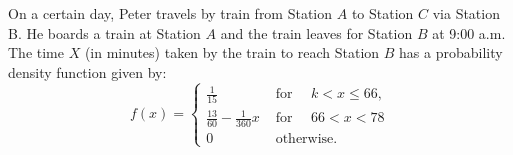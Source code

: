 \documentclass[letterpaper,10pt,addpoints]{exam}
\begin{document}


\newpage
\begin{questions}

\question[40]
On a certain day, Peter travels by train from Station $A$ to Station $C$ via Station B. He boards a train at Station $A$ and the train leaves for Station $B$ at 9:00 a.m. The time $X$ (in minutes) taken by the train to reach Station $B$ has a probability density function given by:
$$
f(x)= \begin{cases}\frac{1}{15} & \text { for } \quad k<x \leq 66, \\ \frac{13}{60}-\frac{1}{360} x & \text { for } \quad 66<x<78 \\ 0 & \text { otherwise. }\end{cases}
$$
\begin{parts}

\end{parts}
\end{questions}
\end{document}
